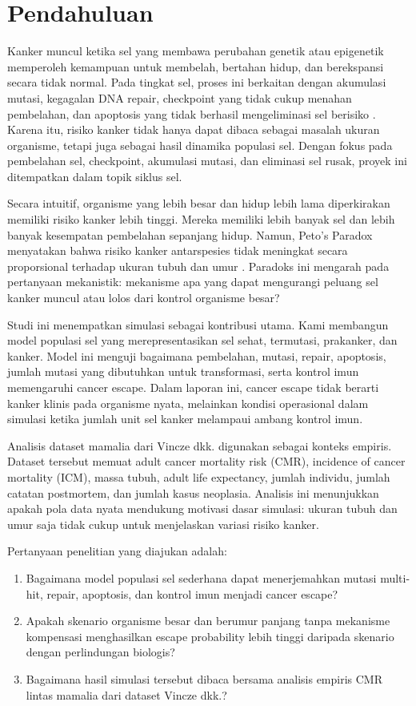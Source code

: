 \section{Pendahuluan}

Kanker muncul ketika sel yang membawa perubahan genetik atau epigenetik
memperoleh kemampuan untuk membelah, bertahan hidup, dan berekspansi secara
tidak normal. Pada tingkat sel, proses ini berkaitan dengan akumulasi mutasi,
kegagalan DNA repair, checkpoint yang tidak cukup menahan pembelahan, dan
apoptosis yang tidak berhasil mengeliminasi sel berisiko
\cite{hanahan2022,alberts2015}. Karena itu, risiko kanker tidak hanya dapat
dibaca sebagai masalah ukuran organisme, tetapi juga sebagai hasil dinamika
populasi sel. Dengan fokus pada pembelahan sel, checkpoint, akumulasi mutasi,
dan eliminasi sel rusak, proyek ini ditempatkan dalam topik siklus sel.

Secara intuitif, organisme yang lebih besar dan hidup lebih lama diperkirakan
memiliki risiko kanker lebih tinggi. Mereka memiliki lebih banyak sel dan lebih
banyak kesempatan pembelahan sepanjang hidup. Namun, Peto's Paradox
menyatakan bahwa risiko kanker antarspesies tidak meningkat secara
proporsional terhadap ukuran tubuh dan umur \cite{peto1977,caulin2011}.
Paradoks ini mengarah pada pertanyaan mekanistik: mekanisme apa yang dapat
mengurangi peluang sel kanker muncul atau lolos dari kontrol organisme besar?

Studi ini menempatkan simulasi sebagai kontribusi utama. Kami membangun model
populasi sel yang merepresentasikan sel sehat, termutasi, prakanker, dan
kanker. Model ini menguji bagaimana pembelahan, mutasi, repair, apoptosis,
jumlah mutasi yang dibutuhkan untuk transformasi, serta kontrol imun
memengaruhi cancer escape. Dalam laporan ini, cancer escape tidak berarti
kanker klinis pada organisme nyata, melainkan kondisi operasional dalam simulasi
ketika jumlah unit sel kanker melampaui ambang kontrol imun.

Analisis dataset mamalia dari Vincze dkk. \cite{vincze2022} digunakan sebagai
konteks empiris. Dataset tersebut memuat adult cancer mortality risk (CMR),
incidence of cancer mortality (ICM), massa tubuh, adult life expectancy, jumlah
individu, jumlah catatan postmortem, dan jumlah kasus neoplasia. Analisis ini
menunjukkan apakah pola data nyata mendukung motivasi dasar simulasi: ukuran
tubuh dan umur saja tidak cukup untuk menjelaskan variasi risiko kanker.

Pertanyaan penelitian yang diajukan adalah:
\begin{enumerate}
    \item Bagaimana model populasi sel sederhana dapat menerjemahkan mutasi
          multi-hit, repair, apoptosis, dan kontrol imun menjadi cancer escape?
    \item Apakah skenario organisme besar dan berumur panjang tanpa mekanisme
          kompensasi menghasilkan escape probability lebih tinggi daripada
          skenario dengan perlindungan biologis?
    \item Bagaimana hasil simulasi tersebut dibaca bersama analisis empiris CMR
          lintas mamalia dari dataset Vincze dkk.?
\end{enumerate}

